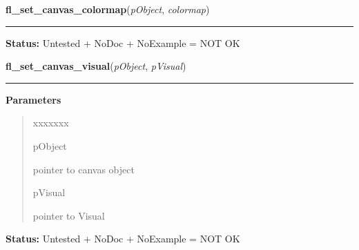    \label{xformslib:library:fl_set_canvas_colormap}

    \vspace{0.5ex}

\hspace{.8\funcindent}\begin{boxedminipage}{\funcwidth}

    \raggedright \textbf{fl\_set\_canvas\_colormap}(\textit{pObject}, \textit{colormap})

    \vspace{-1.5ex}

    \rule{\textwidth}{0.5\fboxrule}
\setlength{\parskip}{2ex}
\setlength{\parskip}{1ex}
\textbf{Status:} Untested + NoDoc + NoExample = NOT OK



    \end{boxedminipage}

    \label{xformslib:library:fl_set_canvas_visual}

    \vspace{0.5ex}

\hspace{.8\funcindent}\begin{boxedminipage}{\funcwidth}

    \raggedright \textbf{fl\_set\_canvas\_visual}(\textit{pObject}, \textit{pVisual})

    \vspace{-1.5ex}

    \rule{\textwidth}{0.5\fboxrule}
\setlength{\parskip}{2ex}
\setlength{\parskip}{1ex}
      \textbf{Parameters}
      \vspace{-1ex}

      \begin{quote}
        \begin{Ventry}{xxxxxxx}

          \item[pObject]

          pointer to canvas object

          \item[pVisual]

          pointer to Visual

        \end{Ventry}

      \end{quote}

\textbf{Status:} Untested + NoDoc + NoExample = NOT OK



    \end{boxedminipage}

